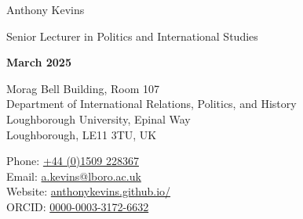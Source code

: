 \documentclass[letterpaper,fontsize=10.5pt]{scrartcl}
\begin{document}


\huge Anthony Kevins\\
\begin{minipage}[t]{.75\linewidth}
	\large Senior Lecturer in Politics and International Studies\\ 
\end{minipage}%
\begin{minipage}[t]{.25\linewidth}
	\raggedleft
	\scriptsize \textbf{March 2025}\\
\end{minipage}%
\normalsize

\hrulefill

\begin{minipage}[p]{.6\linewidth}
	\raggedright
	\medskip
	Morag Bell Building, Room 107\\
	Department of International Relations, Politics, and History\\
	Loughborough University, Epinal Way\\
	Loughborough, LE11 3TU, UK\\
	\medskip
\end{minipage}%
\begin{minipage}[p]{.4\linewidth}
	\raggedleft
	\medskip
	Phone: \href{tel:+4401509228367}{+44 (0)1509 228367}\\
	Email: \href{mailto:a.kevins@lboro.ac.uk}{a.kevins@lboro.ac.uk}\\
	Website: \href{https://anthonykevins.github.io/}{anthonykevins.github.io/}\\
	ORCID: \href{https://orcid.org/0000-0003-3172-6632}{0000-0003-3172-6632}\\
	\medskip%
\end{minipage}

\hrulefill

\end{document}
